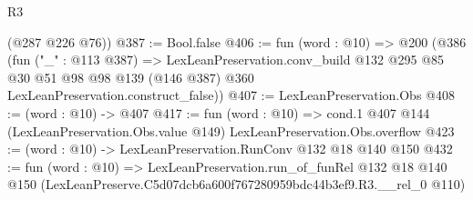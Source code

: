 \begin{lexlean}{R3}
\begin{coremodule}
      (@287 @226 @76))
@387 := Bool.false
@406 := fun (word : @10) =>
  @200
    (@386
      (fun ("_" : @113 @387) =>
      LexLeanPreservation.conv_build
        @132
        @295
        @85
        @30
        @51
        @98
        @98
        @139
        (@146 @387)
        @360
        LexLeanPreservation.construct_false))
@407 := LexLeanPreservation.Obs
@408 := (word : @10) -> @407
@417 := fun (word : @10) =>
  cond.{1} @407 @144 (LexLeanPreservation.Obs.value @149) LexLeanPreservation.Obs.overflow
@423 := (word : @10) -> LexLeanPreservation.RunConv @132 @18 @140 @150
@432 := fun (word : @10) =>
  LexLeanPreservation.run_of_funRel
    @132
    @18
    @140
    @150
    (LexLeanPreserve.C5d07dcb6a600f767280959bdc44b3ef9.R3.__rel_0 @110)
\end{coremodule}
\end{lexlean}
